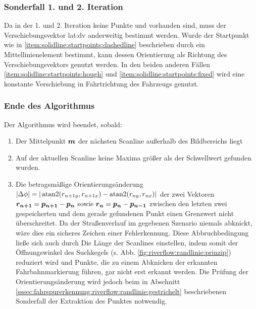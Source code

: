 \subsubsection{Sonderfall 1. und 2. Iteration}
Da in der 1. und 2. Iteration keine Punkte  und  vorhanden sind, muss der Verschiebungsvektor \gls{lat:dv} anderweitig bestimmt werden. 
Wurde der Startpunkt wie in \ref{item:solidline:startpoints:dashedline} beschrieben durch ein Mittellinienelement bestimmt, kann dessen Orientierung als Richtung des Verschiebungsvektors genutzt werden.
In den beiden anderen Fällen \ref{item:solidline:startpoints:hough} und \ref{item:solidline:startpoints:fixed} wird eine konstante Verschiebung in Fahrtrichtung des Fahrzeugs genutzt.

\subsubsection{Ende des Algorithmus} 
Der Algorithmus wird beendet, sobald:
\begin{enumerate}
\item  
Der Mittelpunkt \begin{math} \boldsymbol{m}  \end{math} der nächsten Scanline außerhalb des Bildbereichs liegt
\item \label{item:fahrspurerkennung:riverflow:randlinie:ende:keinpunkt}
Auf der aktuellen Scanline keine Maxima größer als der Schwellwert  gefunden wurden.
\item 
Die betragsmäßige Orientierungsänderung \(|\Delta \phi| = |\operatorname{atan2}(r_{n+1 y}, r_{n+1 x}) - \operatorname{atan2}(r_{n y}, r_{n x})|\) der zwei Vektoren \(\boldsymbol{r_{n+1}}=\boldsymbol{p_{n+1}}-\boldsymbol{p_{n}}\) sowie \(\boldsymbol{r_{n}}=\boldsymbol{p_{n}}-\boldsymbol{p_{n-1}}\) zwischen den letzten zwei gespeicherten und dem gerade gefundenen Punkt einen Grenzwert nicht überschreitet. Da der Straßenverlauf im gegebenen Szenario niemals abknickt, wäre dies ein sicheres Zeichen einer Fehlerkennung. Diese Abbruchbedingung ließe sich auch durch Die Länge der Scanlines einstellen, indem somit der Öffnungswinkel des Suchkegels (s. Abb. \ref{fig:riverflow:randlinie:prinzip}) reduziert wird und Punkte, die zu einem Abknicken der erkannten Fahrbahnmarkierung führen, gar nicht erst erkannt werden. 
Die Prüfung der Orientierungsänderung wird jedoch beim in Abschnitt \ref{sssec:fahrspurerkennung:riverflow:randlinie:gestrichelt} beschriebenen Sonderfall der Extraktion des Punktes  notwendig.
\end{enumerate}

